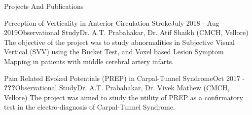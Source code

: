 \documentclass{resume} %
\begin{document}
\begin{rSection}{Projects And Publications}

\begin{rSubsection}{Perception of Verticality in Anterior Circulation Stroke}{July 2018 - Aug 2019}{Observational Study}{Dr. A.T. Prabahakar, Dr. Atif Shaikh (CMCH, Vellore)}
The objective of the project was to study abnormalities in Subjective Visual Vertical (SVV) using the Bucket Test, and Voxel based Lesion Symptom Mapping in patients with middle cerebral artery infarts.
\end{rSubsection}

\begin{rSubsection}{Pain Related Evoked Potentials (PREP) in Carpal-Tunnel Syndrome}{Oct 2017 - \textbf{???}}{Observational Study}{Dr. A.T. Prabahakar, Dr. Vivek Mathew (CMCH, Vellore)}
The project was aimed to study the utility of PREP as a confirmatory test in the electro-diagnosis of Carpal-Tunnel Syndrome.
\end{rSubsection}



\end{rSection}
\end{document}
